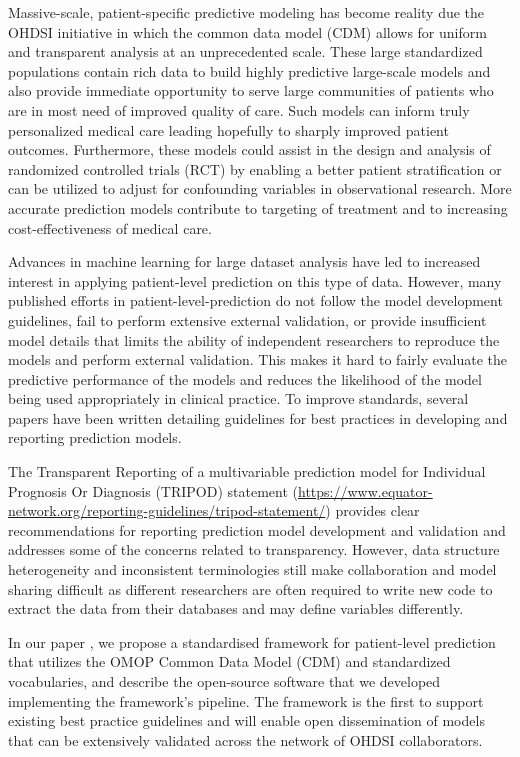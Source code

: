 \documentclass[]{book}
\begin{document}
Massive-scale, patient-specific predictive modeling has become reality
due the OHDSI initiative in which the common data model (CDM) allows for
uniform and transparent analysis at an unprecedented scale. These large
standardized populations contain rich data to build highly predictive
large-scale models and also provide immediate opportunity to serve large
communities of patients who are in most need of improved quality of
care. Such models can inform truly personalized medical care leading
hopefully to sharply improved patient outcomes. Furthermore, these
models could assist in the design and analysis of randomized controlled
trials (RCT) by enabling a better patient stratification or can be
utilized to adjust for confounding variables in observational research.
More accurate prediction models contribute to targeting of treatment and
to increasing cost-effectiveness of medical care.

Advances in machine learning for large dataset analysis have led to
increased interest in applying patient-level prediction on this type of
data. However, many published efforts in patient-level-prediction do not
follow the model development guidelines, fail to perform extensive
external validation, or provide insufficient model details that limits
the ability of independent researchers to reproduce the models and
perform external validation. This makes it hard to fairly evaluate the
predictive performance of the models and reduces the likelihood of the
model being used appropriately in clinical practice. To improve
standards, several papers have been written detailing guidelines for
best practices in developing and reporting prediction models.

The Transparent Reporting of a multivariable prediction model for
Individual Prognosis Or Diagnosis (TRIPOD) statement
(\url{https://www.equator-network.org/reporting-guidelines/tripod-statement/})
provides clear recommendations for reporting prediction model
development and validation and addresses some of the concerns related to
transparency. However, data structure heterogeneity and inconsistent
terminologies still make collaboration and model sharing difficult as
different researchers are often required to write new code to extract
the data from their databases and may define variables differently.

In our paper \citep{reps2018}, we propose a standardised framework for
patient-level prediction that utilizes the OMOP Common Data Model (CDM)
and standardized vocabularies, and describe the open-source software
that we developed implementing the framework's pipeline. The framework
is the first to support existing best practice guidelines and will
enable open dissemination of models that can be extensively validated
across the network of OHDSI collaborators.
\end{document}
